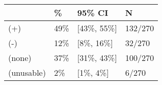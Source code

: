 \begin{tabular}{llll}
\hline
 & \% & 95\% CI  & N \\
\hline
(+) & 49\% & [43\%, 55\%] & 132/270\\
(-) & 12\% & [8\%, 16\%] & 32/270\\
(none) & 37\% & [31\%, 43\%] & 100/270\\
(unusable) & 2\% & [1\%, 4\%] & 6/270\\
\hline
\end{tabular}
